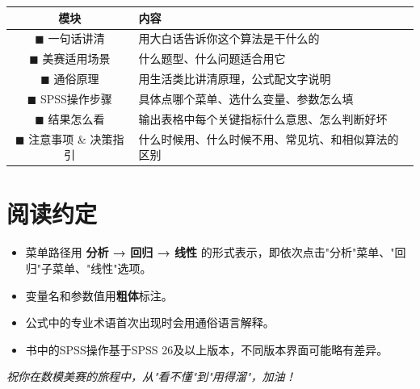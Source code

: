 \begin{center}
\begin{tabular}{cl}
\toprule
\textbf{模块} & \textbf{内容} \\
\midrule
\textcolor{algoBlue}{$\blacksquare$} 一句话讲清 & 用大白话告诉你这个算法是干什么的 \\
\textcolor{algoGreen}{$\blacksquare$} 美赛适用场景 & 什么题型、什么问题适合用它 \\
\textcolor{algoPurple}{$\blacksquare$} 通俗原理 & 用生活类比讲清原理，公式配文字说明 \\
\textcolor{algoOrange}{$\blacksquare$} SPSS操作步骤 & 具体点哪个菜单、选什么变量、参数怎么填 \\
\textcolor{algoTeal}{$\blacksquare$} 结果怎么看 & 输出表格中每个关键指标什么意思、怎么判断好坏 \\
\textcolor{algoRed}{$\blacksquare$} 注意事项 \& 决策指引 & 什么时候用、什么时候不用、常见坑、和相似算法的区别 \\
\bottomrule
\end{tabular}
\end{center}

\section*{阅读约定}

\begin{itemize}
    \item 菜单路径用 \textbf{分析 → 回归 → 线性} 的形式表示，即依次点击"分析"菜单、"回归"子菜单、"线性"选项。
    \item 变量名和参数值用\textbf{粗体}标注。
    \item 公式中的专业术语首次出现时会用通俗语言解释。
    \item 书中的SPSS操作基于SPSS 26及以上版本，不同版本界面可能略有差异。
\end{itemize}

\vspace{1em}
\begin{center}
\textit{祝你在数模美赛的旅程中，从"看不懂"到"用得溜"，加油！}
\end{center}
